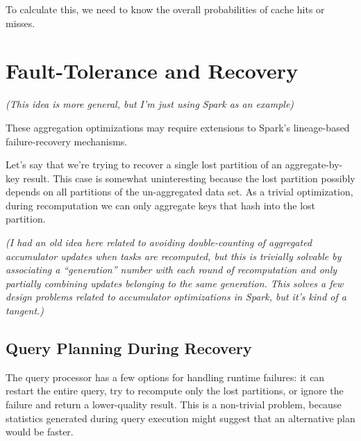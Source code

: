 \documentclass[12pt]{article}
\begin{document}
To calculate this, we need to know the overall probabilities of cache hits or
misses.




\pagebreak

\section{Fault-Tolerance and Recovery}

\emph{(This idea is more general, but I'm just using Spark as an example)}

These aggregation optimizations may require extensions to Spark's lineage-based failure-recovery mechanisms.

Let's say that we're trying to recover a single lost partition of an
aggregate-by-key result.  This case is somewhat uninteresting because the lost
partition possibly depends on all partitions of the un-aggregated data set.
As a trivial optimization, during recomputation we can only aggregate keys
that hash into the lost partition.

\emph{(I had an old idea here related to avoiding double-counting of
aggregated accumulator updates when tasks are recomputed, but this is
trivially solvable by associating a ``generation'' number with each round of
recomputation and only partially combining updates belonging to the same
generation.  This solves a few design problems related to accumulator
optimizations in Spark, but it's kind of a tangent.)}

\subsection{Query Planning During Recovery}

The query processor has a few options for handling runtime failures: it can
restart the entire query, try to recompute only the lost partitions, or ignore
the failure and return a lower-quality result.  This is a non-trivial problem,
because statistics generated during query execution might suggest that an
alternative plan would be faster.



\pagebreak


\end{document}
